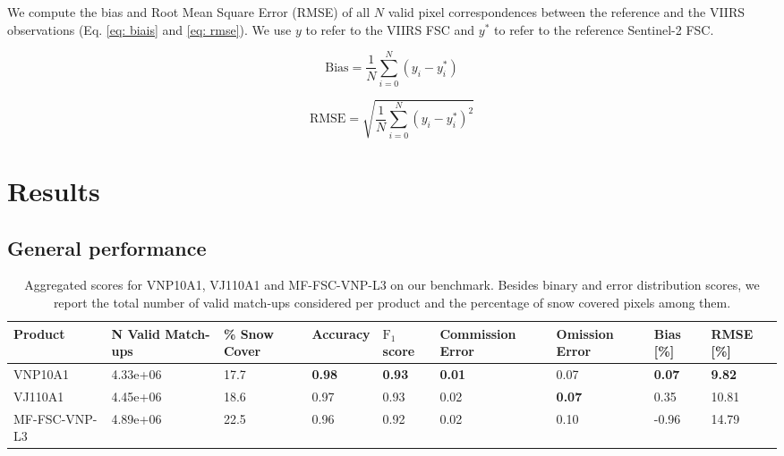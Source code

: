 \documentclass[tc, manuscript]{copernicus}
\begin{document}
 We compute the bias and Root Mean Square Error (RMSE) of all $ N $ valid pixel correspondences between the reference and the VIIRS observations (Eq. \ref{eq: biais} and \ref{eq: rmse}). We use $y$ to refer to the VIIRS FSC and $y^*$ to refer to the reference Sentinel-2 FSC.


\begin{equation}
 \mathrm{Bias} = \frac{1}{N} \sum_{i=0}^{N} (y_i - y^*_i)
\label{eq: biais}
\end{equation}


\begin{equation}
 \mathrm{RMSE} = \sqrt{\frac{1}{N}\sum_{i=0}^{N} (y_i - y^*_i)^2}
 \label{eq: rmse}
\end{equation}


\section{Results}
\label{sec: results}

\subsection{General performance}
\label{subsec: res_global}


\begin{table}[t]
    \caption{Aggregated scores for VNP10A1, VJ110A1 and MF-FSC-VNP-L3 on our benchmark. Besides binary and error distribution scores, we report the total number of valid match-ups considered per product and the percentage of snow covered pixels among them.}
    \label{tab: tab03}
    \begin{tabular}{l|R{2cm}R{2cm}|R{1.3cm} R{1.3cm} R{1.3cm}R{1.3cm}|R{1.3cm}R{1.3cm}}
        \hline
        Product & N Valid Match-ups &\% Snow Cover & Accuracy & $\mathrm{F_1}$ score & \raggedleft Commission Error & Omission Error & Bias [\%] & RMSE [\%] \\
        \hline
        VNP10A1 & 4.33e+06 & 17.7 & \bfseries 0.98 & \bfseries 0.93 & \bfseries 0.01 & 0.07 & \bfseries 0.07 & \bfseries 9.82 \\
        VJ110A1 & 4.45e+06 & 18.6 & 0.97 & 0.93 & 0.02 & \bfseries 0.07 & 0.35 & 10.81 \\
        MF-FSC-VNP-L3 & 4.89e+06 & 22.5 & 0.96 & 0.92 & 0.02 & 0.10 & -0.96 & 14.79 \\
        \hline
    \end{tabular}
\end{table}
\end{document}
